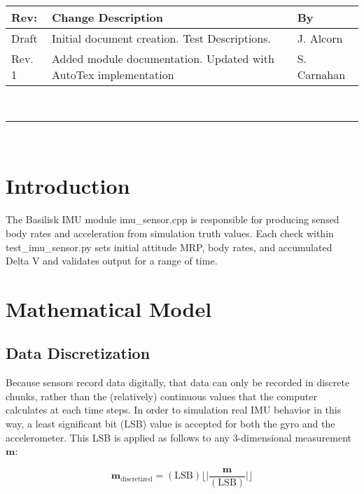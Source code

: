 \documentclass[]{BasiliskReportMemo}
\newcommand{\preparer}{S. Carnahan}
\newcommand{\testname}{test\_imu\_sensor.py }
\begin{document}
\makeCover


%
%
\pagestyle{empty}
{\renewcommand{\arraystretch}{1.1}
\noindent
\begin{longtable}{|p{0.5in}|p{4.5in}|p{1.14in}|}
\hline
{\bfseries Rev}: & {\bfseries Change Description} & {\bfseries By} \\
\hline
Draft & Initial document creation. Test Descriptions. & J. Alcorn \\
\hline
Rev. 1 & Added module documentation. Updated with AutoTex implementation & \preparer \\
\hline

\end{longtable}
}

\newpage
\setcounter{page}{1}
\pagestyle{fancy}

\tableofcontents
~\\ \hrule ~\\


\section{Introduction}
The Basilisk IMU module imu\_sensor.cpp is responsible for producing sensed body rates and acceleration from simulation truth values. Each check within \testname sets initial attitude MRP, body rates, and accumulated Delta V and validates output for a range of time.

\section{Mathematical Model}

\subsection{Data Discretization}
Because sensors record data digitally, that data can only be recorded in discrete chunks, rather than the (relatively) continuous values that the computer calculates at each time steps. In order to simulation real IMU behavior in this way, a least significant bit (LSB) value is accepted for both the gyro and the accelerometer. This LSB is applied as follows to any 3-dimensional measurement $\mathbf{m}$:

\begin{equation}
\mathbf{m}_{\mathrm{discretized}} = (\mathrm{LSB})\Biggl\lfloor\Biggl|\frac{\mathbf{m}}{(\mathrm{LSB})}\Biggr|\Biggr\rfloor
\end{equation}
\end{document}
